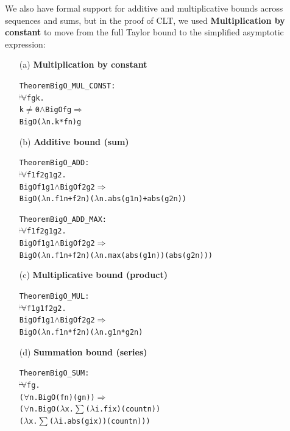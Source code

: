 We also have formal support for additive and multiplicative bounds across sequences and sums, but in the proof of CLT, we used \textbf{Multiplication by constant} to move from the full Taylor bound to the simplified asymptotic expression:

\begin{proposition}
  \label{prop:bigO-algebra}
\begin{itemize}
  \item[(a)] \textbf{Multiplication by constant}
  \begin{hol}
\begin{alltt}
Theorem BigO\_MUL\_CONST :
\(\!\!\!{\turn}\!\!\!\!\) \(\forall\)f g k.
k \(\ne\) 0 \(\land\) BigO f g \(\Rightarrow\)
BigO (\(\lambda\)n. k * f n) g
\end{alltt}
\end{hol}
  \item[(b)] \textbf{Additive bound (sum)}
  \begin{hol}
\begin{alltt}
Theorem BigO\_ADD :
\(\!\!\!{\turn}\!\!\!\!\) \(\forall\)f1 f2 g1 g2.
BigO f1 g1 \(\land\) BigO f2 g2 \(\Rightarrow\)
BigO (\(\lambda\)n. f1 n + f2 n) (\(\lambda\)n. abs (g1 n) + abs (g2 n))
\end{alltt}
\end{hol}

\begin{hol}
\begin{alltt}
Theorem BigO\_ADD\_MAX :
\(\!\!\!{\turn}\!\!\!\!\) \(\forall\)f1 f2 g1 g2.
BigO f1 g1 \(\land\) BigO f2 g2 \(\Rightarrow\)
BigO (\(\lambda\)n. f1 n + f2 n) (\(\lambda\)n. max (abs (g1 n)) (abs (g2 n)))
\end{alltt}
\end{hol}
  \item[(c)] \textbf{Multiplicative bound (product)}
  \begin{hol}
\begin{alltt}
Theorem BigO\_MUL :
\(\!\!\!{\turn}\!\!\!\!\) \(\forall\)f1 g1 f2 g2.
BigO f1 g1 \(\land\) BigO f2 g2 \(\Rightarrow\)
BigO (\(\lambda\)n. f1 n * f2 n) (\(\lambda\)n. g1 n * g2 n)
\end{alltt}
\end{hol}
  \item[(d)] \textbf{Summation bound (series)}
  \begin{hol}
\begin{alltt}
Theorem BigO\_SUM :
\(\!\!\!{\turn}\!\!\!\!\) \(\forall\)f g.
(\(\forall\)n. BigO (f n) (g n)) \(\Rightarrow\)
(\(\forall\)n. BigO (\(\lambda\)x. \(\sum\) (\(\lambda\)i. f i x) (count n))
               (\(\lambda\)x. \(\sum\) (\(\lambda\)i. abs (g i x)) (count n)))
\end{alltt}
\end{hol}
\end{itemize}
\end{proposition}

